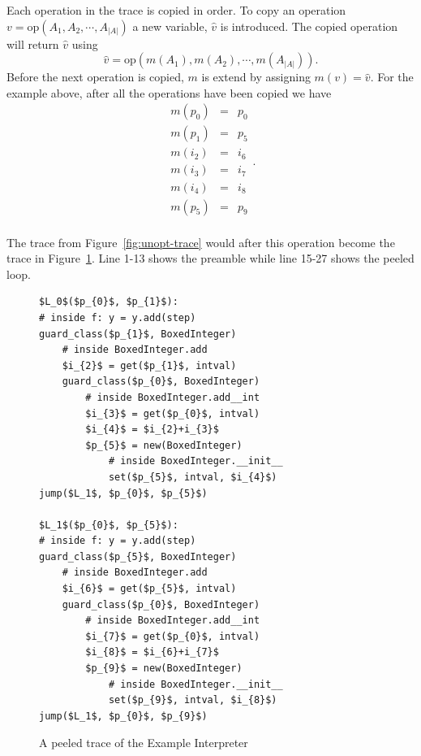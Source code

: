 \documentclass[preprint]{sigplanconf}
\begin{document}
Each operation in the trace is copied in order.
To copy an operation $v=\text{op}\left(A_1, A_2, \cdots, A_{|A|}\right)$
a new variable, $\hat v$ is introduced. The copied operation will
return $\hat v$ using
\begin{equation}
  \hat v = \text{op}\left(m\left(A_1\right), m\left(A_2\right), 
    \cdots, m\left(A_{|A|}\right)\right) . 
\end{equation}
Before the
next operation is copied, $m$ is extend by assigning $m\left(v\right) = \hat
v$. For the example above, after all the operations have been copied we have
\begin{equation}
    \begin{array}{lcl}
      m\left(p_0\right) &=& p_0 \\
      m\left(p_1\right) &=& p_5 \\
      m\left(i_2\right) &=& i_6 \\
      m\left(i_3\right) &=& i_7 \\
      m\left(i_4\right) &=& i_8 \\
      m\left(p_5\right) &=& p_9 \\
    \end{array}
  .
\end{equation}

The trace from Figure~\ref{fig:unopt-trace} would after this operation become
the trace in Figure~\ref{fig:peeled-trace}. Line 1-13 shows the
preamble while line 15-27 shows the peeled loop.

\begin{figure}
\begin{lstlisting}[mathescape,numbers = right,basicstyle=\setstretch{1.05}\ttfamily\scriptsize]
$L_0$($p_{0}$, $p_{1}$):
# inside f: y = y.add(step)
guard_class($p_{1}$, BoxedInteger)
    # inside BoxedInteger.add
    $i_{2}$ = get($p_{1}$, intval)
    guard_class($p_{0}$, BoxedInteger)
        # inside BoxedInteger.add__int
        $i_{3}$ = get($p_{0}$, intval)
        $i_{4}$ = $i_{2}+i_{3}$
        $p_{5}$ = new(BoxedInteger)
            # inside BoxedInteger.__init__
            set($p_{5}$, intval, $i_{4}$)
jump($L_1$, $p_{0}$, $p_{5}$)

$L_1$($p_{0}$, $p_{5}$):
# inside f: y = y.add(step)
guard_class($p_{5}$, BoxedInteger)
    # inside BoxedInteger.add
    $i_{6}$ = get($p_{5}$, intval)
    guard_class($p_{0}$, BoxedInteger)
        # inside BoxedInteger.add__int
        $i_{7}$ = get($p_{0}$, intval)
        $i_{8}$ = $i_{6}+i_{7}$
        $p_{9}$ = new(BoxedInteger)
            # inside BoxedInteger.__init__
            set($p_{9}$, intval, $i_{8}$)
jump($L_1$, $p_{0}$, $p_{9}$)
\end{lstlisting}
\caption{A peeled trace of the Example Interpreter}
\label{fig:peeled-trace}
\end{figure}
\end{document}
